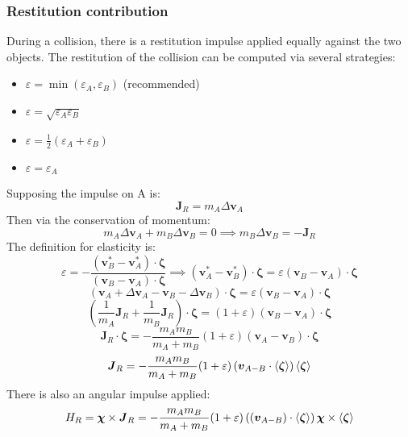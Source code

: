 \documentclass[10pt]{report}
\begin{document}
\subsubsection{Restitution contribution}
During a collision, there is a restitution impulse applied equally against the two objects. The restitution of the collision can be computed via several strategies:
\begin{itemize}
\item $\varepsilon=\min(\varepsilon_A,\varepsilon_B)$ (recommended)
\item $\varepsilon=\sqrt{\varepsilon_A\varepsilon_B}$
\item $\varepsilon=\frac{1}{2}(\varepsilon_A+\varepsilon_B)$
\item $\varepsilon=\varepsilon_A$
\end{itemize}
Supposing the impulse on A is:
\begin{equation}\boldsymbol{J}_R=m_A\Delta\boldsymbol{v}_A\end{equation}
Then via the conservation of momentum:
\begin{equation}m_A\Delta\boldsymbol{v}_A+m_B\Delta\boldsymbol{v}_B=0\implies m_B\Delta\boldsymbol{v}_B=-\boldsymbol{J}_R\end{equation}
The definition for elasticity is:
\begin{equation}\varepsilon=-\frac{(\boldsymbol{v}_B^*-\boldsymbol{v}_A^*)\cdot\boldsymbol{\zeta}}{(\boldsymbol{v}_B-\boldsymbol{v}_A)\cdot\boldsymbol{\zeta}}\implies(\boldsymbol{v}_A^*-\boldsymbol{v}_B^*)\cdot\boldsymbol{\zeta}=\varepsilon(\boldsymbol{v}_B-\boldsymbol{v}_A)\cdot\boldsymbol{\zeta}\end{equation}
\begin{equation}(\boldsymbol{v}_A+\Delta\boldsymbol{v}_A-\boldsymbol{v}_B-\Delta\boldsymbol{v}_B)\cdot\boldsymbol{\zeta}=\varepsilon(\boldsymbol{v}_B-\boldsymbol{v}_A)\cdot\boldsymbol{\zeta}\end{equation}
\begin{equation}\left(\frac{1}{m_A}\boldsymbol{J}_R+\frac{1}{m_B}\boldsymbol{J}_R\right)\cdot\boldsymbol{\zeta}=(1+\varepsilon)(\boldsymbol{v}_B-\boldsymbol{v}_A)\cdot\boldsymbol{\zeta}\end{equation}
\begin{equation}\boldsymbol{J}_R\cdot\boldsymbol{\zeta}=-\frac{m_Am_B}{m_A+m_B}(1+\varepsilon)(\boldsymbol{v}_A-\boldsymbol{v}_B)\cdot\boldsymbol{\zeta}\end{equation}
\begin{equation}\boldsymbol{J}_R=-\frac{m_Am_B}{m_A+m_B}(1+\varepsilon)\left(\boldsymbol{v}_{A-B}\cdot\braket{\boldsymbol{\zeta}}\right)\braket{\boldsymbol{\zeta}}\end{equation}
There is also an angular impulse applied:
\begin{equation}H_R=\boldsymbol{\chi}\times\boldsymbol{J}_R=-\frac{m_Am_B}{m_A+m_B}(1+\varepsilon)\left((\boldsymbol{v}_{A-B})\cdot\braket{\boldsymbol{\zeta}}\right)\boldsymbol{\chi}\times\braket{\boldsymbol{\zeta}}\end{equation}
\end{document}

